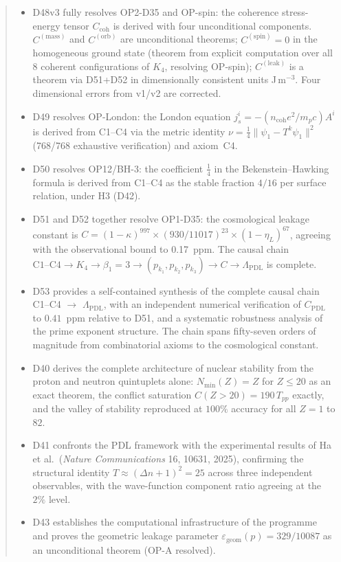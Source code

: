\documentclass[11pt,a4paper]{article}
\theoremstyle{plain}
\theoremstyle{definition}
\theoremstyle{remark}
\newcommand{\Kfour}{K_4}
\newcommand{\Tpp}{T_{pp}}
\newcommand{\Nmin}{N_{\min}}
\newcommand{\Ccoh}{C_{\mathrm{coh}}}
\begin{document}
\begin{abstract}
\begin{itemize}
\item D48v3 fully resolves OP2-D35 and OP-spin: the coherence stress-energy tensor $\Ccoh$ is derived with four unconditional components. $C^{(\mathrm{mass})}$ and $C^{(\mathrm{orb})}$ are unconditional theorems; $C^{(\mathrm{spin})}=0$ in the homogeneous ground state (theorem from explicit computation over all 8 coherent configurations of $K_4$, resolving OP-spin); $C^{(\mathrm{leak})}$ is a theorem via D51+D52 in dimensionally consistent units J\,m$^{-3}$. Four dimensional errors from v1/v2 are corrected.
\item D49 resolves OP-London: the London equation $j^i_s = -(n_{\mathrm{coh}} e^2/m_p c) A^i$ is derived from C1--C4 via the metric identity $\nu = \tfrac{1}{4}\|\psi_1 - T^k\psi_1\|^2$ (768/768 exhaustive verification) and axiom~C4.
\item D50 resolves OP12/BH-3: the coefficient $\tfrac{1}{4}$ in the Bekenstein--Hawking formula is derived from C1--C4 as the stable fraction $4/16$ per surface relation, under H3 (D42).
\item D51 and D52 together resolve OP1-D35: the cosmological leakage constant is $C = (1-\kappa)^{997} \times (930/11017)^{23} \times (1-\eta_L)^{67}$, agreeing with the observational bound to 0.17~ppm. The causal chain $\mathrm{C1}\text{--}\mathrm{C4} \to \Kfour \to \beta_1=3 \to (p_{k_1},p_{k_2},p_{k_3}) \to C \to \Lambda_{\mathrm{PDL}}$ is complete.
\item D53 provides a self-contained synthesis of the complete causal chain C1--C4 $\to$ $\Lambda_{\mathrm{PDL}}$, with an independent numerical verification of $C_{\mathrm{PDL}}$ to $0.41$~ppm relative to D51, and a systematic robustness analysis of the prime exponent structure. The chain spans fifty-seven orders of magnitude from combinatorial axioms to the cosmological constant.
\item D40 derives the complete architecture of nuclear stability from the proton and neutron quintuplets alone: $\Nmin(Z) = Z$ for $Z \leq 20$ as an exact theorem, the conflict saturation $C(Z>20) = 190\,\Tpp$ exactly, and the valley of stability reproduced at $100\%$ accuracy for all $Z=1$ to $82$.
\item D41 confronts the PDL framework with the experimental results of Ha et al.\ (\textit{Nature Communications} 16, 10631, 2025), confirming the structural identity $T \approx (\Delta n+1)^2 = 25$ across three independent observables, with the wave-function component ratio agreeing at the $2\%$ level.
\item D43 establishes the computational infrastructure of the programme and proves the geometric leakage parameter $\varepsilon_{\mathrm{geom}}(p) = 329/10087$ as an unconditional theorem (OP-A resolved).

\end{itemize}
\end{abstract}
\end{document}
